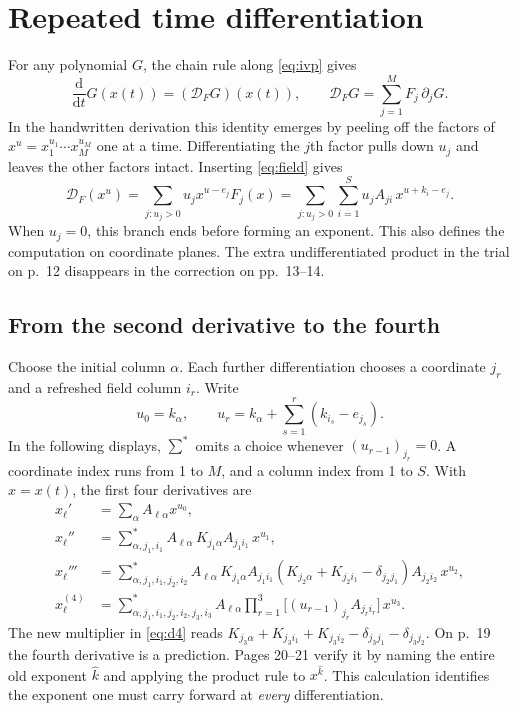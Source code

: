 \documentclass[11pt,letterpaper]{article}
\newcommand{\dd}{\mathrm{d}}
\newcommand{\D}{\mathcal{D}_F}
\newcommand{\src}[1]{\par\smallskip\noindent{\small\itshape Notebook, #1.}\par\medskip}
\begin{document}
\section{Repeated time differentiation}\label{sec:derivatives}
For any polynomial \(G\), the chain rule along \eqref{eq:ivp} gives
\[
  \frac{\dd}{\dd t}G(x(t))=(\D G)(x(t)),\qquad
  \D G=\sum_{j=1}^M F_j\,\partial_jG .
\]
In the handwritten derivation this identity emerges by peeling off the factors
of \(x^u=x_1^{u_1}\cdots x_M^{u_M}\) one at a time. Differentiating the
\(j\)th factor pulls down \(u_j\) and leaves the other factors intact. Inserting
\eqref{eq:field} gives
\begin{equation}\label{eq:one}
 \D(x^u)
 =\sum_{j:u_j>0}u_j x^{u-e_j}F_j(x)
 =\sum_{j:u_j>0}\sum_{i=1}^S u_j A_{ji}\,x^{u+k_i-e_j}.
\end{equation}
When \(u_j=0\), this branch ends before forming an exponent. This also
defines the computation on coordinate planes. The extra undifferentiated
product in the trial on p.~12 disappears in the correction on pp.~13--14.

\subsection{From the second derivative to the fourth}
Choose the initial column \(\alpha\). Each further differentiation chooses a
coordinate \(j_r\) and a refreshed field column \(i_r\). Write
\[
 u_0=k_\alpha,\qquad
 u_r=k_\alpha+\sum_{s=1}^{r}(k_{i_s}-e_{j_s}).
\]
In the following displays, \(\sum^{*}\) omits a choice whenever
\((u_{r-1})_{j_r}=0\). A coordinate index runs from 1 to \(M\), and a column
index from 1 to \(S\). With \(x=x(t)\), the first four derivatives are
\begin{align}
 x_\ell' &= \sum_\alpha A_{\ell\alpha}x^{u_0},\nonumber\\
 x_\ell'' &= \sum_{\alpha,j_1,i_1}^{*}
  A_{\ell\alpha}\,K_{j_1\alpha} A_{j_1 i_1}\,x^{u_1},\label{eq:d2}\\
 x_\ell''' &= \sum_{\alpha,j_1,i_1,j_2,i_2}^{*}
  A_{\ell\alpha}\,K_{j_1\alpha} A_{j_1 i_1}
    (K_{j_2\alpha}+K_{j_2i_1}-\delta_{j_2 j_1}) A_{j_2i_2}\,x^{u_2},
    \label{eq:d3}\\
 x_\ell^{(4)} &= \sum_{\alpha,j_1,i_1,j_2,i_2,j_3,i_3}^{*}
 A_{\ell\alpha}\prod_{r=1}^{3}\big[(u_{r-1})_{j_r} A_{j_ri_r}\big]\,
 x^{u_3}. \label{eq:d4}
\end{align}
The new multiplier in \eqref{eq:d4} reads
\(K_{j_3\alpha}+K_{j_3i_1}+K_{j_3i_2}-\delta_{j_3j_1}-\delta_{j_3j_2}\).
On p.~19 the fourth derivative is a prediction. Pages 20--21 verify it by
naming the entire old exponent \(\hat k\) and applying the product rule to
\(x^{\hat k}\). This calculation identifies the exponent one must carry
forward at \emph{every} differentiation.
\src{pp.~4--6, 12--21, 23--24}
\end{document}
